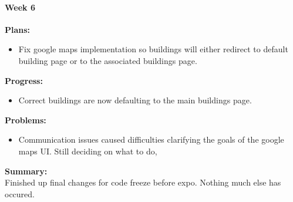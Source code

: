 \paragraph{Week 6}
\begin{adjustwidth}{2.5em}{0pt}
    \vspace{-0.5cm}\textbf{Plans:}
    \vspace{-0.5cm}
    \begin{itemize}
        \item Fix google maps implementation so buildings will either redirect to default building page or to the associated buildings page.
    \end{itemize} 
    \vspace{-0.3cm}\textbf{Progress:}
    \vspace{-0.5cm}
    \begin{itemize}
        \item Correct buildings are now defaulting to the main buildings page.
    \end{itemize} 
    \vspace{-0.3cm}\textbf{Problems:}
    \vspace{-0.5cm}
    \begin{itemize}
        \item Communication issues caused difficulties clarifying the goals of the google maps UI. Still deciding on what to do,
    \end{itemize}  
    \vspace{-0.3cm}\noindent\textbf{Summary:}\\
    \noindent Finished up final changes for code freeze before expo. Nothing much else has occured.
\end{adjustwidth} 
